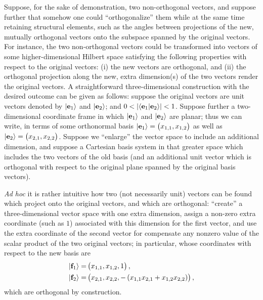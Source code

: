 \documentclass[%
 preprint,
 showpacs,
 showkeys,
 preprintnumbers,
 amsmath,amssymb,
 aps,
  pra,
  longbibliography,
 ]{revtex4-1}
\begin{document}
Suppose, for the sake of demonstration, two non-orthogonal vectors, and suppose
further that somehow one could ``orthogonalize'' them while at the same time
retaining structural elements, such as the angles
between projections of the new, mutually orthogonal vectors
onto the subspace spanned by the original vectors.
For instance, the two non-orthogonal vectors could be transformed into
vectors of some higher-dimensional Hilbert space satisfying the following
properties with respect to the original vectors: (i) the new vectors are
orthogonal, and (ii) the orthogonal projection along the new, extra
dimension(s) of the two vectors render the original vectors. A straightforward
three-dimensional construction with the desired outcome can be given as
follows: suppose the original vectors are unit vectors denoted by $\vert {\bf
e}_1 \rangle$ and $\vert {\bf e}_2 \rangle$; and $0 < \vert \langle {\bf e}_1
\vert {\bf e}_2 \rangle \vert < 1$. Suppose further a two-dimensional
coordinate frame in which $\vert {\bf e}_1 \rangle$ and $\vert {\bf e}_2
\rangle$ are planar; thus we can write, in terms of some orthonormal basis
$\vert {\bf e}_1 \rangle =\begin{pmatrix}x_{1,1},x_{1,2}\end{pmatrix}$ as well
as $\vert {\bf e}_2 \rangle =\begin{pmatrix}x_{2,1},x_{2,2}\end{pmatrix}$.
Suppose we ``enlarge'' the vector space to include an additional dimension, and
suppose a Cartesian basis system in that greater space which includes the two
vectors of the old basis (and an additional unit vector which is orthogonal
with respect to the original plane spanned by the original basis vectors).

{\it Ad hoc} it is rather intuitive how two (not necessarily unit) vectors can
be found which project onto the original vectors, and which are orthogonal:
``create'' a three-dimensional vector space with one extra dimension, assign
a non-zero extra coordinate (such as $1$) associated with this dimension for
the first vector, and use the extra coordinate of the second vector for
compensate any nonzero value of the scalar product of the two original vectors;
in particular, whose coordinates with respect to the new basis are%
\begin{equation}
\begin{aligned}
\vert {\bf f}_1 \rangle =& \begin{pmatrix}x_{1,1},x_{1,2},1\end{pmatrix},\\
\vert {\bf f}_2 \rangle =&
\begin{pmatrix}
x_{2,1},x_{2,2}, - \left( x_{1,1}x_{2,1} + x_{1,2}x_{2,2} \right)
\end{pmatrix},
\end{aligned}%
\end{equation}
which are orthogonal by construction.
\end{document}
